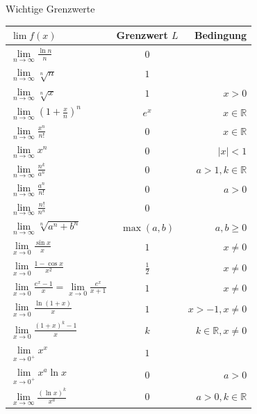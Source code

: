 \begin{minipage}{\linewidth}
\Tab Wichtige Grenzwerte

\begin{tabular}{l c r}
    $\lim f(x)$ & Grenzwert $L$ & Bedingung \\
    \hline
    $\lim\limits_{n\to\infty} \frac{\ln n}{n}$ & $0$ & \\[1ex]
    $\lim\limits_{n\to\infty} \sqrt[n]{n}$ & $1$ & \\[1ex]
    $\lim\limits_{n\to\infty} \sqrt[n]{x}$ & $1$ & $x > 0$ \\[1ex]
    $\lim\limits_{n\to\infty} \left(1 + \frac{x}{n}\right)^n$ & $e^x$ & $x \in \mathbb{R}$ \\[1ex]
    $\lim\limits_{n\to\infty} \frac{x^n}{n!}$ & $0$ & $x \in \mathbb{R}$ \\[0.5ex]
    \hline
    $\lim\limits_{n\to\infty} x^n$ & $0$ & $|x| < 1$ \\[1ex]
    $\lim\limits_{n\to\infty} \frac{n^k}{a^n}$ & $0$ & $a > 1, k \in \mathbb{R}$ \\[1ex]
    $\lim\limits_{n\to\infty} \frac{a^n}{n!}$ & $0$ & $a > 0$ \\[1ex]
    $\lim\limits_{n\to\infty} \frac{n!}{n^n}$ & $0$ & \\[1ex]
    $\lim\limits_{n\to\infty} \sqrt[n]{a^n + b^n}$ & $\max(a, b)$ & $a, b \ge 0$ \\
    \hline
    $\lim\limits_{x\to 0} \frac{\sin x}{x}$ & $1$ & $x \neq 0$ \\[1ex]
    $\lim\limits_{x\to 0} \frac{1 - \cos x}{x^2}$ & $\frac{1}{2}$ & $x \neq 0$ \\[1ex]
    $\lim\limits_{x\to 0} \frac{e^x - 1}{x} = \lim\limits_{x\to 0} \frac{e^x}{x + 1}$ & $1$ & $x \neq 0$ \\[1ex]
    $\lim\limits_{x\to 0} \frac{\ln(1 + x)}{x}$ & $1$ & $x > -1, x \neq 0$ \\[1ex]
    $\lim\limits_{x\to 0} \frac{(1 + x)^k - 1}{x}$ & $k$ & $k \in \mathbb{R}, x \neq 0$ \\[0.5ex]
    \hline
    $\lim\limits_{x\to 0^+} x^x$ & $1$ & \\[1ex]
    $\lim\limits_{x\to 0^+} x^a \ln x$ & $0$ & $a > 0$ \\[1ex]
    $\lim\limits_{x\to\infty} \frac{(\ln x)^k}{x^a}$ & $0$ & $a > 0, k \in \mathbb{R}$
\end{tabular}
\end{minipage}

